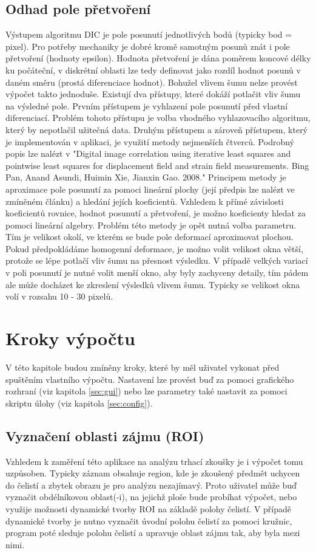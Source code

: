\documentclass[a4paper,12pt]{article}
\begin{document}
\subsection{Odhad pole přetvoření}
Výstupem algoritmu DIC je pole posunutí jednotlivých bodů (typicky bod = pixel). Pro potřeby mechaniky je dobré kromě samotným posunů znát i pole přetvoření (hodnoty epsilon). Hodnota přetvoření je dána poměrem koncové délky ku počáteční, v diskrétní oblasti lze tedy definovat jako rozdíl hodnot posunů v daném směru (prostá diferenciace hodnot). Bohužel vlivem šumu nelze provést výpočet takto jednoduše. Existují dva přístupy, které dokáží potlačit vliv šumu na výsledné pole. Prvním přístupem je vyhlazení pole posunutí před vlastní diferenciací. Problém tohoto přístupu je volba vhodného vyhlazovacího algoritmu, který by nepotlačil užitečná data. Druhým přístupem a zároveň přístupem, který je implementován v aplikaci, je využití metody nejmenších čtverců. Podrobný popis lze nalézt v "Digital image correlation using iterative least squares and pointwise least squares for displacement field and strain field measurements. Bing Pan, Anand Asundi, Huimin Xie, Jianxin Gao. 2008." Principem metody je aproximace pole posunutí za pomoci lineární plochy (její předpis lze nalézt ve zmíněném článku) a hledání jejích koeficientů. Vzhledem k přímé závislosti koeficientů rovnice, hodnot posunutí a přetvoření, je možno koeficienty hledat za pomoci lineární algebry. Problém této metody je opět nutná volba parametru. Tím je velikost okolí, ve kterém se bude pole deformací aproximovat plochou. Pokud předpokládáme homogenní deformace, je možno volit velikost okna větší, protože se lépe potlačí vliv šumu na přesnost výsledku. V případě velkých variací v poli posunutí je nutné volit menší okno, aby byly zachyceny detaily, tím pádem ale může docházet ke zkreslení výsledků vlivem šumu. Typicky se velikost okna volí v rozsahu 10 - 30 pixelů.
\newpage
\section{Kroky výpočtu}
V této kapitole budou zmíněny kroky, které by měl uživatel vykonat před spuštěním vlastního výpočtu. Nastavení lze provést buď za pomoci grafického rozhraní (viz kapitola \ref{sec:gui}) nebo lze parametry také nastavit za pomoci skriptu úlohy (viz kapitola \ref{sec:config}).
\subsection{Vyznačení oblasti zájmu (ROI)}
Vzhledem k zaměření této aplikace na analýzu trhací zkoušky je i výpočet tomu uzpůsoben. Typicky záznam obsahuje region, kde je zkoušený předmět uchycen do čelistí a zbytek obrazu je pro analýzu nezajímavý. Proto uživatel může buď vyznačit obdélníkovou oblast(-i), na jejichž ploše bude probíhat výpočet, nebo využije možnosti dynamické tvorby ROI na základě polohy čelistí. V případě dynamické tvorby je nutno vyznačit úvodní polohu čelistí za pomoci kružnic, program poté sleduje polohu čelistí a upravuje oblast zájmu tak, aby byla mezi nimi.
\end{document}
